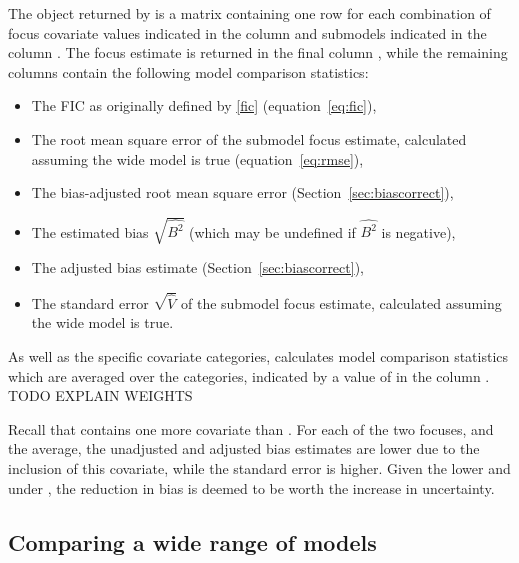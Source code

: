 \documentclass[article,shortnames,nojss,nofooter]{jss}\usepackage[]{graphicx}\usepackage[]{color}
\begin{document}
The object returned by  is a matrix containing one row for
each combination of focus covariate values indicated in the column  and submodels indicated in the column .   The focus estimate is returned in the final column , while the remaining columns contain the following model comparison statistics:
\begin{itemize}
\item {} The FIC as originally defined by \ref{fic} (equation~\ref{eq:fic}),
\item {} The root mean square error of the submodel focus
  estimate, calculated assuming the wide model is true (equation~\ref{eq:rmse}),
\item {} The bias-adjusted root mean square error (Section~\ref{sec:biascorrect}),
\item {} The estimated bias $\sqrt{\widehat{B^2}}$ (which may be undefined if $\widehat{B^2}$ is negative),
\item {} The adjusted bias estimate (Section~\ref{sec:biascorrect}),
\item {} The standard error $\sqrt{\hat{V}}$ of
  the submodel focus estimate, calculated assuming the wide model is true.
\end{itemize}

As well as the specific covariate categories,  calculates 
model comparison statistics which are averaged over the categories, indicated by a value of  in the column .
TODO EXPLAIN WEIGHTS

Recall that  contains one more covariate than .  For each of the
two focuses, and the average, the unadjusted and adjusted bias
estimates are lower due to the inclusion of this covariate, while the
standard error  is higher.  Given the lower  and
 under , the reduction in bias is deemed to
be worth the increase in uncertainty.


\subsection{Comparing a wide range of models }
\end{document}
